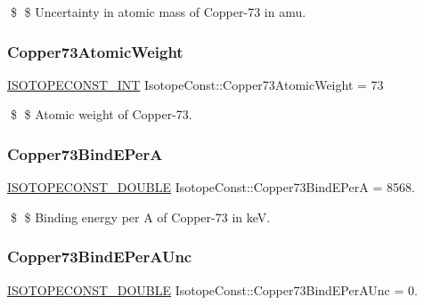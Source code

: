 \$ \$ Uncertainty in atomic mass of Copper-\/73 in amu. \mbox{\label{group___isotope_const-_copper-_cu73_gad053ac96199c0f7a4ee7fc66c811d975}} 
\subsubsection{\texorpdfstring{Copper73\+Atomic\+Weight}{Copper73AtomicWeight}}
{\footnotesize\ttfamily \mbox{\hyperlink{group___isotope_const-_macros_ga5f18360b3e99483a35c32d789e62621c}{I\+S\+O\+T\+O\+P\+E\+C\+O\+N\+S\+T\+\_\+\+I\+NT}} Isotope\+Const\+::\+Copper73\+Atomic\+Weight = 73}

\$ \$ Atomic weight of Copper-\/73. \mbox{\label{group___isotope_const-_copper-_cu73_gaade442943d3633d180f035f3e9a1188b}} 
\subsubsection{\texorpdfstring{Copper73\+Bind\+E\+PerA}{Copper73BindEPerA}}
{\footnotesize\ttfamily \mbox{\hyperlink{group___isotope_const-_macros_ga8f45a7272ce02c0b4c65c44636ed719a}{I\+S\+O\+T\+O\+P\+E\+C\+O\+N\+S\+T\+\_\+\+D\+O\+U\+B\+LE}} Isotope\+Const\+::\+Copper73\+Bind\+E\+PerA = 8568.}

\$ \$ Binding energy per A of Copper-\/73 in keV. \mbox{\label{group___isotope_const-_copper-_cu73_ga2468745c33f272b056e09815b24a6319}} 
\subsubsection{\texorpdfstring{Copper73\+Bind\+E\+Per\+A\+Unc}{Copper73BindEPerAUnc}}
{\footnotesize\ttfamily \mbox{\hyperlink{group___isotope_const-_macros_ga8f45a7272ce02c0b4c65c44636ed719a}{I\+S\+O\+T\+O\+P\+E\+C\+O\+N\+S\+T\+\_\+\+D\+O\+U\+B\+LE}} Isotope\+Const\+::\+Copper73\+Bind\+E\+Per\+A\+Unc = 0.}


